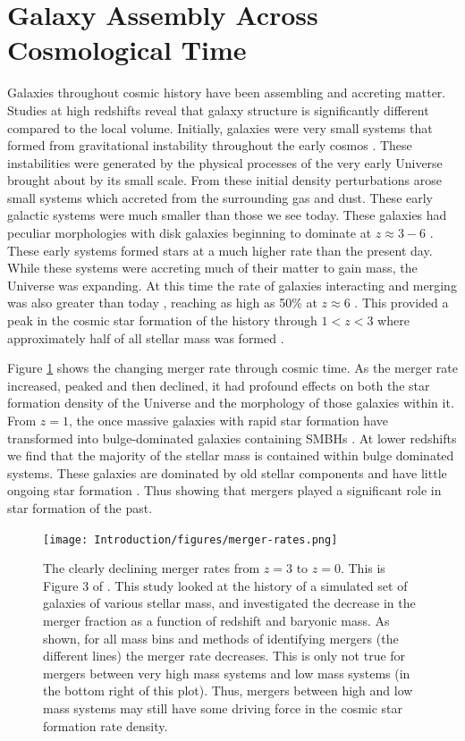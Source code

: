 \section{Galaxy Assembly Across Cosmological Time}
\noindent Galaxies throughout cosmic history have been assembling and accreting matter. Studies at high redshifts reveal that galaxy structure is significantly different compared to the local volume. Initially, galaxies were very small systems that formed from gravitational instability throughout the early cosmos \citep{1993MNRAS.262..627L}. These instabilities were generated by the physical processes of the very early Universe brought about by its small scale. From these initial density perturbations arose small systems which accreted from the surrounding gas and dust. These early galactic systems were much smaller than those we see today. These galaxies had peculiar morphologies \citep{2005ApJ...627..632E} with disk galaxies beginning to dominate at $z\approx3 - 6$ \citep{2022ApJ...938L...2F}. These early systems formed stars at a much higher rate than the present day. While these systems were accreting much of their matter to gain mass, the Universe was expanding. At this time the rate of galaxies interacting and merging was also greater than today \citep{2010ApJ...715..202H, 2011ApJ...742..103L}, reaching as high as 50\% at $z\approx6$ \citep{2009MNRAS.397..208C, 2009MNRAS.394L..51B}. This provided a peak in the cosmic star formation of the history through $1 < z < 3$ where approximately half of all stellar mass was formed \citep{2005ApJ...625..621B}.

Figure \ref{fig:merger-rate} shows the changing merger rate through cosmic time. As the merger rate increased, peaked and then declined, it had profound effects on both the star formation density of the Universe and the morphology of those galaxies within it. From $z = 1$, the once massive galaxies with rapid star formation have transformed into bulge-dominated galaxies containing SMBHs \citep{2007ApJ...654..858B}. At lower redshifts we find that the majority of the stellar mass is contained within bulge dominated systems. These galaxies are dominated by old stellar components and have little ongoing star formation \citep{2002AJ....124..646H, 2004ApJ...608..752B}. Thus showing that mergers played a significant role in star formation of the past. 

\begin{figure}
\centering
\texttt{[image: Introduction/figures/merger-rates.png]}
\caption[The declining merger rates from z = 3 to z = 0.]{The clearly declining merger rates from $z = 3$ to $z = 0$. This is Figure 3 of \citet{2010ApJ...715..202H}. This study looked at the history of a simulated set of galaxies of various stellar mass, and investigated the decrease in the merger fraction as a function of redshift and baryonic mass. As shown, for all mass bins and methods of identifying mergers (the different lines) the merger rate decreases. This is only not true for mergers between very high mass systems and low mass systems (in the bottom right of this plot). Thus, mergers between high and low mass systems may still have some driving force in the cosmic star formation rate density.}
\label{fig:merger-rate}
\end{figure}

